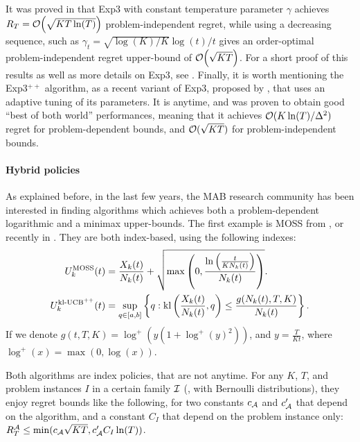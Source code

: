 %
It was proved in \cite{Auer02NonStochastic} that Exp3 with constant temperature parameter $\gamma$ achieves $R_T = \mathop{}\mathopen{}\mathcal{O}\mathopen{}\left(\sqrt{K T \ln(T)}\right)$ problem-independent regret,
while using a decreasing sequence, such as $\gamma_t = \sqrt{\log(K) / K} \log(t) / t$ gives an order-optimal problem-independent regret upper-bound of $\mathop{}\mathopen{}\mathcal{O}\mathopen{}\left(\sqrt{K T}\right)$.
For a short proof of this results as well as more details on Exp3, see \cite{Bubeck12}.
%
Finally, it is worth mentioning the Exp3$^{++}$ algorithm, as a recent variant of Exp3, proposed by \cite{Seldin17},
that uses an adaptive tuning of its parameters.
It is anytime, and was proven to obtain good ``best of both world'' performances, meaning that it achieves $\mathcal{O}(K\ln(T)/\Delta^2)$ regret for problem-dependent bounds, and $\mathcal{O}(\sqrt{KT})$ for problem-independent bounds.



\paragraph{Hybrid policies}

As explained before, in the last few years, the MAB research community has been interested in finding algorithms which achieves both a problem-dependent logarithmic and a minimax upper-bounds.
The first example is MOSS from \cite{Audibert2009minimax}, or recently \KLUCBpp{} in \cite{Menard17}.
They are both index-based, using the following indexes:
\begin{align}\label{eq:2:indexes_for_MOSS_klUCBpp}
    U^{\mathrm{MOSS}}_k(t) &= \frac{X_k(t)}{N_k(t)} + \sqrt{\max\left(0, \frac{\ln\left(\frac{t}{K N_k(t)}\right)}{N_k(t)}\right)}. \\
    U^{\mathrm{kl}\text{-}\mathrm{UCB}^{++}}_k(t) &= \sup\limits_{q \in [a, b]} \left\{ q : \mathrm{kl}\left(\frac{X_k(t)}{N_k(t)}, q\right) \leq \frac{g(N_k(t), T, K)}{N_k(t)} \right\}.
\end{align}
%
If we denote $g(t, T, K) = \log^+(y (1 + \log^+(y)^2))$, and $y = \frac{T}{K t}$, where $\log^+(x) = \max(0, \log(x))$.

Both algorithms are index policies, that are not anytime.
For any $K$, $T$, and problem instances $I$ in a certain family $\mathcal{I}$ (\eg, with Bernoulli distributions),
they enjoy regret bounds like the following, for two constants $c_{\mathcal{A}}$ and $c'_{\mathcal{A}}$ that depend on the algorithm, and a constant $C_I$ that depend on the problem instance only: $R_T^{\mathcal{A}} \leq \min( c_{\mathcal{A}} \sqrt{K T}, c'_{\mathcal{A}} C_I \ln(T))$.

